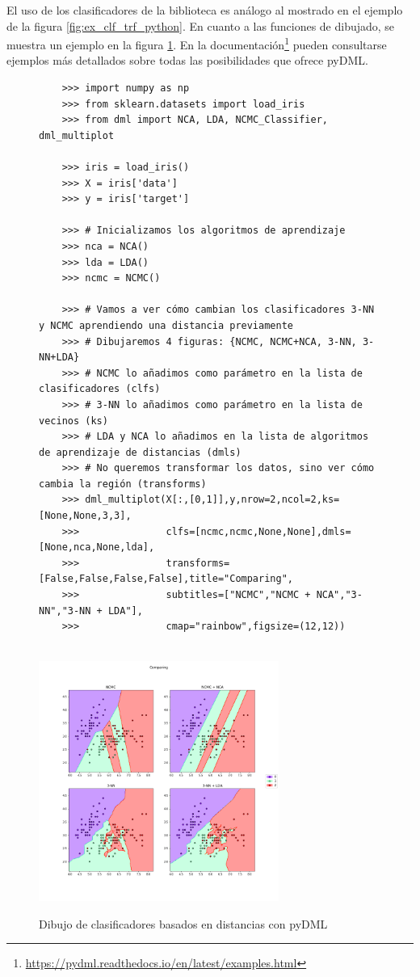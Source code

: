 El uso de los clasificadores de la biblioteca es análogo al mostrado en el ejemplo de la figura \ref{fig:ex_clf_trf_python}. En cuanto a las funciones de dibujado, se muestra un ejemplo en la figura \ref{fig:ex_dmlplot}. En la documentación\footnote{\url{https://pydml.readthedocs.io/en/latest/examples.html}} pueden consultarse ejemplos más detallados sobre todas las posibilidades que ofrece pyDML.

\begin{figure}[h]
\begin{verbatim}
    >>> import numpy as np
    >>> from sklearn.datasets import load_iris
    >>> from dml import NCA, LDA, NCMC_Classifier, dml_multiplot

    >>> iris = load_iris()
    >>> X = iris['data']
    >>> y = iris['target']

    >>> # Inicializamos los algoritmos de aprendizaje
    >>> nca = NCA()
    >>> lda = LDA()
    >>> ncmc = NCMC()

    >>> # Vamos a ver cómo cambian los clasificadores 3-NN y NCMC aprendiendo una distancia previamente
    >>> # Dibujaremos 4 figuras: {NCMC, NCMC+NCA, 3-NN, 3-NN+LDA}
    >>> # NCMC lo añadimos como parámetro en la lista de clasificadores (clfs)
    >>> # 3-NN lo añadimos como parámetro en la lista de vecinos (ks)
    >>> # LDA y NCA lo añadimos en la lista de algoritmos de aprendizaje de distancias (dmls)
    >>> # No queremos transformar los datos, sino ver cómo cambia la región (transforms)
    >>> dml_multiplot(X[:,[0,1]],y,nrow=2,ncol=2,ks=[None,None,3,3],
    >>>               clfs=[ncmc,ncmc,None,None],dmls=[None,nca,None,lda],
    >>>               transforms=[False,False,False,False],title="Comparing",
    >>>               subtitles=["NCMC","NCMC + NCA","3-NN","3-NN + LDA"],
    >>>               cmap="rainbow",figsize=(12,12))
\end{verbatim}
\\
\centering
\includegraphics[width=0.7\textwidth]{images/plotdoc7.png}

\caption{Dibujo de clasificadores basados en distancias con pyDML} \label{fig:ex_dmlplot}
\end{figure}

